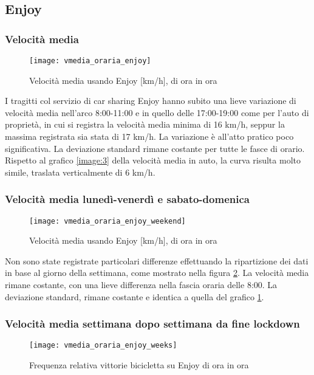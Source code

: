 \subsection{Enjoy}

\subsubsection{Velocità media}

\begin{figure}[H]
\texttt{[image: vmedia\_oraria\_enjoy]}
\caption{Velocità media usando Enjoy [km/h], di ora in ora}
\label{image:7}
\end{figure}

I tragitti col servizio di car sharing Enjoy hanno subito una lieve variazione di velocità media nell'arco 8:00-11:00 e in quello delle 17:00-19:00 come per l'auto di proprietà, in cui si registra la velocità media minima di 16 km/h, seppur la massima registrata sia stata di 17 km/h. La variazione è all'atto pratico poco significativa. La deviazione standard rimane costante per tutte le fasce di orario. Rispetto al grafico \ref{image:3} della velocità media in auto, la curva risulta molto simile, traslata verticalmente di 6 km/h.

\subsubsection{Velocità media lunedì-venerdì e sabato-domenica}

\begin{figure}[H]
	\texttt{[image: vmedia\_oraria\_enjoy\_weekend]}
	\caption{Velocità media usando Enjoy [km/h], di ora in ora}
	\label{image:20}
\end{figure}

Non sono state registrate particolari differenze effettuando la ripartizione dei dati in base al giorno della settimana, come mostrato nella figura \ref{image:20}. La velocità media rimane costante, con una lieve differenza nella fascia oraria delle 8:00. La deviazione standard, rimane costante e identica a quella del grafico \ref{image:7}.

\subsubsection{Velocità media settimana dopo settimana da fine lockdown}

\begin{figure}[H]
	\texttt{[image: vmedia\_oraria\_enjoy\_weeks]}
	\caption{Frequenza relativa vittorie bicicletta su Enjoy di ora in ora}
	\label{image:16}
\end{figure}

